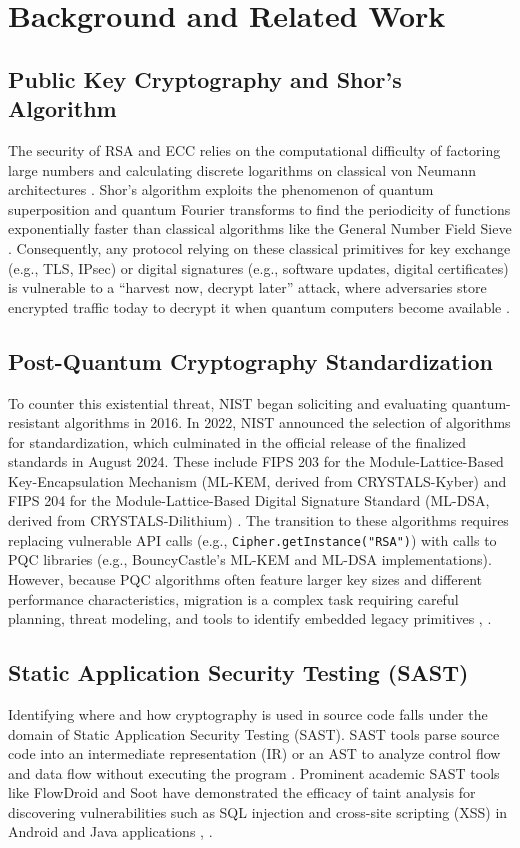 \documentclass[conference]{IEEEtran}
\begin{document}
\section{Background and Related Work}

\subsection{Public Key Cryptography and Shor's Algorithm}
The security of RSA and ECC relies on the computational difficulty of factoring large numbers and calculating discrete logarithms on classical von Neumann architectures \cite{diffie1976}. Shor's algorithm exploits the phenomenon of quantum superposition and quantum Fourier transforms to find the periodicity of functions exponentially faster than classical algorithms like the General Number Field Sieve \cite{shor1994}. Consequently, any protocol relying on these classical primitives for key exchange (e.g., TLS, IPsec) or digital signatures (e.g., software updates, digital certificates) is vulnerable to a ``harvest now, decrypt later'' attack, where adversaries store encrypted traffic today to decrypt it when quantum computers become available \cite{stebila2010}.

\subsection{Post-Quantum Cryptography Standardization}
To counter this existential threat, NIST began soliciting and evaluating quantum-resistant algorithms in 2016. In 2022, NIST announced the selection of algorithms for standardization, which culminated in the official release of the finalized standards in August 2024. These include FIPS 203 for the Module-Lattice-Based Key-Encapsulation Mechanism (ML-KEM, derived from CRYSTALS-Kyber) \cite{fips203} and FIPS 204 for the Module-Lattice-Based Digital Signature Standard (ML-DSA, derived from CRYSTALS-Dilithium) \cite{fips204}. The transition to these algorithms requires replacing vulnerable API calls (e.g., \texttt{Cipher.getInstance("RSA")}) with calls to PQC libraries (e.g., BouncyCastle's ML-KEM and ML-DSA implementations). However, because PQC algorithms often feature larger key sizes and different performance characteristics, migration is a complex task requiring careful planning, threat modeling, and tools to identify embedded legacy primitives \cite{avanzi2020}, \cite{jenkins2024}.

\subsection{Static Application Security Testing (SAST)}
Identifying where and how cryptography is used in source code falls under the domain of Static Application Security Testing (SAST). SAST tools parse source code into an intermediate representation (IR) or an AST to analyze control flow and data flow without executing the program \cite{livshits2005}. Prominent academic SAST tools like FlowDroid and Soot have demonstrated the efficacy of taint analysis for discovering vulnerabilities such as SQL injection and cross-site scripting (XSS) in Android and Java applications \cite{arzt2014}, \cite{lam2011}.
\end{document}
